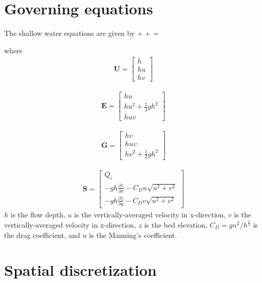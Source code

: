 \documentclass{article}
\newcommand{\p}{{\partial}}
\def\EQ#1\EN{\begin{equation}#1\end{equation}}
\begin{document}
\section{Governing equations}

The shallow water equations are given by
\EQ
\label{eqn:swe}
\frac{\p\mathbf{U}}{\p t} + \frac{\p \mathbf{E}}{\p x} + \frac{\p \mathbf{G}}{\p x} = 
\EN

where 
\begin{align}
	\mathbf{U}
	=
	\begin{bmatrix}
	h \\[.5em]
	hu \\[.5em]
	hv
	\end{bmatrix}
\end{align}

\begin{align}
	\mathbf{E}
	=
	\begin{bmatrix}
	hu \\[.5em]
	hu^2 + \frac{1}{2}gh^2 \\[.5em]
	huv
	\end{bmatrix}
\end{align}

\begin{align}
	\mathbf{G}
	=
	\begin{bmatrix}
	hv \\[.5em]
	huv \\[.5em]
	hv^2 + \frac{1}{2}gh^2
	\end{bmatrix}
\end{align}

\begin{align}
	\mathbf{S}
	=
	\begin{bmatrix}
	Q_i \\[.5em]
	-gh\frac{\p z}{\p x} - C_D u \sqrt{u^2 + v^2}\\[.5em]
	-gh\frac{\p z}{\p y} - C_D v \sqrt{u^2 + v^2}
	\end{bmatrix}
\end{align}
%
$h$ is the flow depth,
$u$ is the vertically-averaged velocity in x-direction,
$v$ is the vertically-averaged velocity in x-direction,
$z$ is the bed elevation,
$C_D = g n^2/h^\frac{1}{3}$ is the drag coefficient, and
$n$ is the Manning's coefficient.

\section{Spatial discretization}
\end{document}

